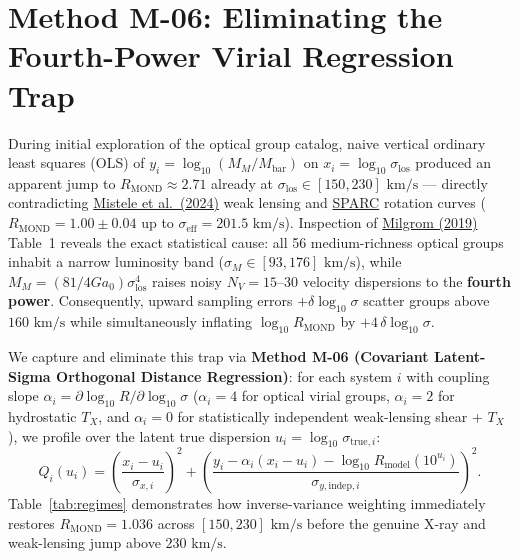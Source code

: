 \documentclass[11pt,a4paper]{article}
\begin{document}
\begin{enumerate}
\end{enumerate}

\section{Method M-06: Eliminating the Fourth-Power Virial Regression Trap}

During initial exploration of the optical group catalog, naive vertical ordinary least squares (OLS) of $y_i = \log_{10}(M_M/M_{\mathrm{bar}})$ on $x_i = \log_{10}\sigma_{\mathrm{los}}$ produced an apparent jump to $R_{\mathrm{MOND}} \approx 2.71$ already at $\sigma_{\mathrm{los}} \in [150, 230]\text{ km/s}$ — directly contradicting \href{https://arxiv.org/html/2406.09685v1}{Mistele et al.\ (2024)} weak lensing and \href{https://astroweb.cwru.edu/SPARC/RARbins.mrt}{SPARC} rotation curves ($R_{\mathrm{MOND}} = 1.00 \pm 0.04$ up to $\sigma_{\mathrm{eff}} = 201.5\text{ km/s}$). Inspection of \href{https://arxiv.org/html/1811.12233v2}{Milgrom (2019)} Table~1 reveals the exact statistical cause: all 56 medium-richness optical groups inhabit a narrow luminosity band ($\sigma_M \in [93, 176]\text{ km/s}$), while $M_M = (81/4Ga_0)\sigma_{\mathrm{los}}^4$ raises noisy $N_V = 15\text{--}30$ velocity dispersions to the \textbf{fourth power}. Consequently, upward sampling errors $+\delta\log_{10}\sigma$ scatter groups above $160\text{ km/s}$ while simultaneously inflating $\log_{10} R_{\mathrm{MOND}}$ by $+4\,\delta\log_{10}\sigma$.

We capture and eliminate this trap via \textbf{Method M-06 (Covariant Latent-Sigma Orthogonal Distance Regression)}: for each system $i$ with coupling slope $\alpha_i = \partial\log_{10} R / \partial\log_{10}\sigma$ ($\alpha_i = 4$ for optical virial groups, $\alpha_i = 2$ for hydrostatic $T_X$, and $\alpha_i = 0$ for statistically independent weak-lensing shear + $T_X$), we profile over the latent true dispersion $u_i = \log_{10}\sigma_{\mathrm{true},i}$:
\begin{equation}
  Q_i(u_i) = \left(\frac{x_i - u_i}{\sigma_{x,i}}\right)^2 + \left(\frac{y_i - \alpha_i(x_i - u_i) - \log_{10} R_{\mathrm{model}}(10^{u_i})}{\sigma_{y,\mathrm{indep},i}}\right)^2.
\end{equation}
Table~\ref{tab:regimes} demonstrates how inverse-variance weighting immediately restores $R_{\mathrm{MOND}} = 1.036$ across $[150, 230]\text{ km/s}$ before the genuine X-ray and weak-lensing jump above $230\text{ km/s}$.
\end{document}
